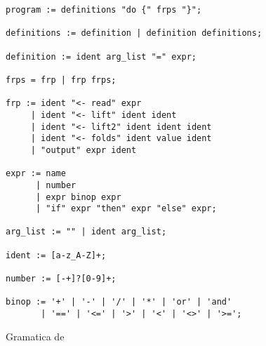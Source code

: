 \begin{figure}[h!]
  \begin{center}
    \caption{Gramatica de \frob{}}
    \begin{Verbatim}[frame=single]
program := definitions "do {" frps "}";

definitions := definition | definition definitions;

definition := ident arg_list "=" expr;

frps = frp | frp frps;

frp := ident "<- read" expr
     | ident "<- lift" ident ident
     | ident "<- lift2" ident ident ident
     | ident "<- folds" ident value ident
     | "output" expr ident

expr := name
      | number
      | expr binop expr
      | "if" expr "then" expr "else" expr;

arg_list := "" | ident arg_list;

ident := [a-z_A-Z]+;

number := [-+]?[0-9]+;

binop := '+' | '-' | '/' | '*' | 'or' | 'and'
       | '==' | '<=' | '>' | '<' | '<>' | '>=';
     \end{Verbatim}
   \label{fig:grammar}
   \end{center}
 \end{figure}
